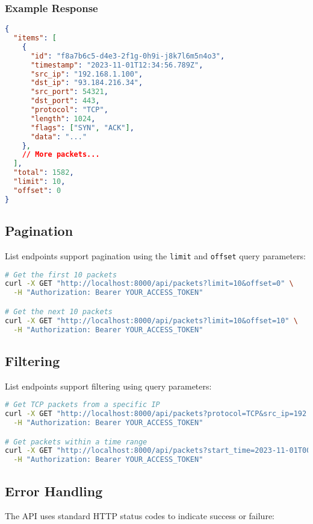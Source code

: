 \subsubsection{Example Response}
\begin{lstlisting}[language=json, caption=Example API Response]
{
  "items": [
    {
      "id": "f8a7b6c5-d4e3-2f1g-0h9i-j8k7l6m5n4o3",
      "timestamp": "2023-11-01T12:34:56.789Z",
      "src_ip": "192.168.1.100",
      "dst_ip": "93.184.216.34",
      "src_port": 54321,
      "dst_port": 443,
      "protocol": "TCP",
      "length": 1024,
      "flags": ["SYN", "ACK"],
      "data": "..."
    },
    // More packets...
  ],
  "total": 1582,
  "limit": 10,
  "offset": 0
}
\end{lstlisting}

\subsection{Pagination}
List endpoints support pagination using the \texttt{limit} and \texttt{offset} query parameters:

\begin{lstlisting}[language=bash, caption=Pagination Example]
# Get the first 10 packets
curl -X GET "http://localhost:8000/api/packets?limit=10&offset=0" \
  -H "Authorization: Bearer YOUR_ACCESS_TOKEN"

# Get the next 10 packets
curl -X GET "http://localhost:8000/api/packets?limit=10&offset=10" \
  -H "Authorization: Bearer YOUR_ACCESS_TOKEN"
\end{lstlisting}

\subsection{Filtering}
List endpoints support filtering using query parameters:

\begin{lstlisting}[language=bash, caption=Filtering Example]
# Get TCP packets from a specific IP
curl -X GET "http://localhost:8000/api/packets?protocol=TCP&src_ip=192.168.1.100" \
  -H "Authorization: Bearer YOUR_ACCESS_TOKEN"

# Get packets within a time range
curl -X GET "http://localhost:8000/api/packets?start_time=2023-11-01T00:00:00Z&end_time=2023-11-01T23:59:59Z" \
  -H "Authorization: Bearer YOUR_ACCESS_TOKEN"
\end{lstlisting}

\subsection{Error Handling}
The API uses standard HTTP status codes to indicate success or failure:

